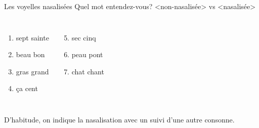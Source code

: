 \begin{frame}{Les voyelles nasalisées}
  Quel mot entendez-vous? <non-nasalisée> vs <nasalisée> \\
  \begin{columns}[t]
      \begin{enumerate}
        \item sept sainte
        \item beau bon
        \item gras grand
        \item ça cent
      \end{enumerate}
      \begin{enumerate}
        \setcounter{enumi}{4}
        \item sec cinq
        \item peau pont
        \item chat chant
      \end{enumerate}
  \end{columns}
  \vspace{0.5cm}
  D'habitude, on indique la nasalisation avec un  suivi d'une autre consonne. \\
\end{frame}